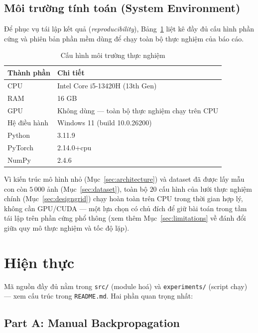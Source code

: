 \documentclass[12pt,a4paper]{article}
\newcommand{\en}[1]{\textit{#1}}
\begin{document}
\subsection{Môi trường tính toán (System Environment)}
\label{sec:sysenv}

Để phục vụ tái lập kết quả (\en{reproducibility}), Bảng~\ref{tab:sysenv}
liệt kê đầy đủ cấu hình phần cứng và phiên bản phần mềm dùng để chạy toàn
bộ thực nghiệm của báo cáo.

\begin{table}[H]
\centering
\caption{Cấu hình môi trường thực nghiệm}
\small
\begin{tabular}{@{}ll@{}}
\toprule
\textbf{Thành phần} & \textbf{Chi tiết} \\
\midrule
CPU & Intel Core i5-13420H (13th Gen) \\
RAM & 16 GB \\
GPU & Không dùng --- toàn bộ thực nghiệm chạy trên CPU \\
Hệ điều hành & Windows 11 (build 10.0.26200) \\
Python & 3.11.9 \\
PyTorch & 2.14.0+cpu \\
NumPy & 2.4.6 \\
\bottomrule
\end{tabular}
\label{tab:sysenv}
\end{table}

Vì kiến trúc mô hình nhỏ (Mục~\ref{sec:architecture}) và dataset đã được
lấy mẫu con còn $5\,000$ ảnh (Mục~\ref{sec:dataset}), toàn bộ $20$ cấu
hình của lưới thực nghiệm chính (Mục~\ref{sec:designgrid}) chạy hoàn toàn
trên CPU trong thời gian hợp lý, không cần GPU/CUDA --- một lựa chọn có
chủ đích để giữ bài toán trong tầm tái lập trên phần cứng phổ thông (xem
thêm Mục~\ref{sec:limitations} về đánh đổi giữa quy mô thực nghiệm và tốc
độ lặp).

\section{Hiện thực}
\label{sec:implementation}

Mã nguồn đầy đủ nằm trong \texttt{src/} (module hoá) và
\texttt{experiments/} (script chạy) --- xem cấu trúc trong
\texttt{README.md}. Hai phần quan trọng nhất:

\subsection{Part A: Manual Backpropagation}
\end{document}
